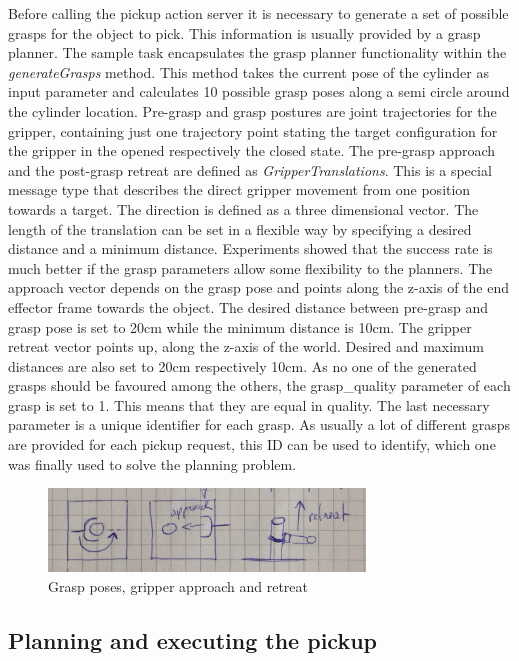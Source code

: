 Before calling the pickup action server it is necessary to generate a set of possible grasps for the object to pick. This information is usually provided by a grasp planner. The sample task encapsulates the grasp planner functionality within the \emph{generateGrasps} method. This method takes the current pose of the cylinder as input parameter and calculates 10 possible grasp poses along a semi circle around the cylinder location. Pre-grasp and grasp postures are joint trajectories for the gripper, containing just one trajectory point stating the target configuration for the gripper in the opened respectively the closed state. The pre-grasp approach and the post-grasp retreat are defined as \emph{GripperTranslations}. This is a special message type that describes the direct gripper movement from one position towards a target. The direction is defined as a three dimensional vector. The length of the translation can be set in a flexible way by specifying a desired distance and a minimum distance. Experiments showed that the success rate is much better if the grasp parameters allow some flexibility to the planners. The approach vector depends on the grasp pose and points along the z-axis of the end effector frame towards the object. The desired distance between pre-grasp and grasp pose is set to 20cm while the minimum distance is 10cm. The gripper retreat vector points up, along the z-axis of the world. Desired and maximum distances are also set to 20cm respectively 10cm. As no one of the generated grasps should be favoured among the others, the grasp\_quality parameter of each grasp is set to 1. This means that they are equal in quality. The last necessary parameter is a unique identifier for each grasp. As usually a lot of different grasps are provided for each pickup request, this ID can be used to identify, which one was finally used to solve the planning problem.

\begin{figure}[ht]
	\centering
  	\includegraphics[width=0.75\textwidth]{images/grasp_stages.jpg}
	\caption{Grasp poses, gripper approach and retreat}
	\label{fig:grasp_stages}
\end{figure}

\subsection{Planning and executing the pickup}


